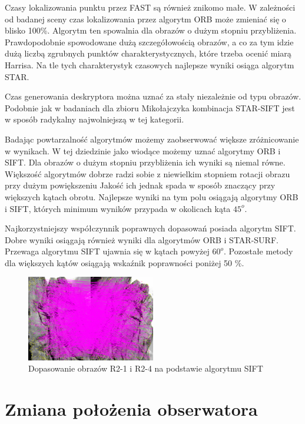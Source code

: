 Czasy lokalizowania punktu przez FAST są również znikomo małe. W zależności od badanej sceny czas lokalizowania przez algorytm ORB może zmieniać się o blisko 100\%. Algorytm ten spowalnia dla obrazów o dużym stopniu przybliżenia. Prawdopodobnie spowodowane dużą szczegółowością obrazów, a co za tym idzie dużą liczbą zgrubnych punktów charakterystycznych, które trzeba ocenić miarą Harrisa. Na tle tych charakterystyk czasowych najlepsze wyniki osiąga algorytm STAR.

Czas generowania deskryptora można uznać za stały niezależnie od typu obrazów. Podobnie jak w badaniach dla zbioru Mikołajczyka kombinacja STAR-SIFT jest w sposób radykalny najwolniejszą w tej kategorii.

Badając powtarzalność algorytmów możemy zaobserwować większe zróżnicowanie w wynikach. W tej dziedzinie jako wiodące możemy uznać algorytmy ORB i SIFT. Dla obrazów o dużym stopniu przybliżenia ich wyniki są niemal równe. Większość algorytmów dobrze radzi sobie z niewielkim stopniem rotacji obrazu przy dużym powiększeniu Jakość ich jednak spada w sposób znaczący przy większych kątach obrotu. Najlepsze wyniki na tym polu osiągają algorytmy ORB i SIFT, których minimum wyników przypada w okolicach kąta $45^o$.

Najkorzystniejszy współczynnik poprawnych dopasowań posiada algorytm SIFT. Dobre wyniki osiągają również wyniki dla algorytmów ORB i STAR-SURF. Przewaga algorytmu SIFT ujawnia się w kątach powyżej $60^o$. Pozostałe metody dla większych kątów osiągają wskaźnik poprawności poniżej 50 \%.

\begin{figure}
\centering
\includegraphics[width=0.5\textwidth]{pict/badania/r2_sift_1-3.png}
\caption{Dopasowanie obrazów R2-1 i R2-4 na podstawie algorytmu SIFT}
\end{figure}

\FloatBarrier
\newpage
\section{Zmiana położenia obserwatora}
\FloatBarrier
